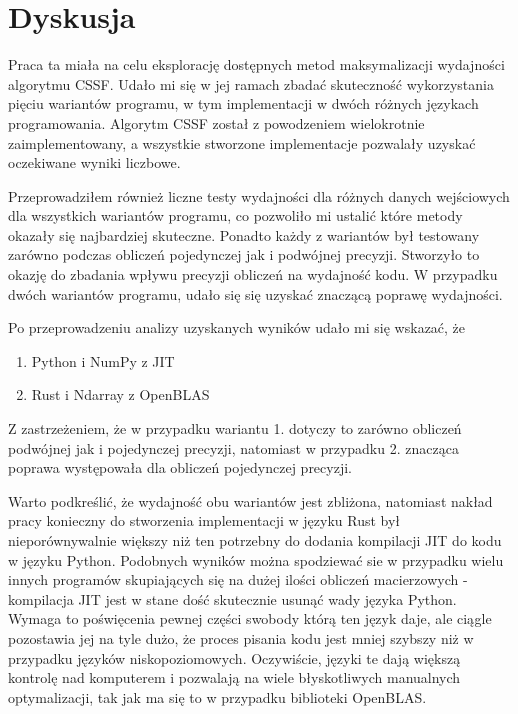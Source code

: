 \documentclass[11pt, a4paper]{article}
\begin{document}
\begin{sloppypar}
    \section{Dyskusja}


    Praca ta miała na celu eksplorację dostępnych metod maksymalizacji wydajności algorytmu
    CSSF. Udało mi się w jej ramach zbadać skuteczność wykorzystania pięciu wariantów
    programu, w tym implementacji w dwóch różnych językach programowania. Algorytm CSSF
    został z powodzeniem wielokrotnie zaimplementowany, a wszystkie stworzone implementacje
    pozwalały uzyskać oczekiwane wyniki liczbowe.

    Przeprowadziłem również liczne testy wydajności dla różnych danych wejściowych dla wszystkich
    wariantów programu, co pozwoliło mi ustalić które metody okazały się najbardziej
    skuteczne. Ponadto każdy z wariantów był testowany zarówno podczas obliczeń pojedynczej
    jak i podwójnej precyzji. Stworzyło to okazję do zbadania wpływu precyzji obliczeń
    na wydajność kodu. W przypadku dwóch wariantów programu, udało się się uzyskać
    znaczącą poprawę wydajności.

    Po przeprowadzeniu analizy uzyskanych wyników udało mi się wskazać, że
    \begin{enumerate}
      \item Python i NumPy z JIT

      \item Rust i Ndarray z OpenBLAS
    \end{enumerate}
    Z zastrzeżeniem, że w przypadku wariantu 1. dotyczy to zarówno obliczeń podwójnej
    jak i pojedynczej precyzji, natomiast w przypadku 2. znacząca poprawa występowała dla
    obliczeń pojedynczej precyzji.

    Warto podkreślić, że wydajność obu wariantów jest zbliżona, natomiast nakład pracy konieczny
    do stworzenia implementacji w języku Rust był nieporównywalnie większy niż ten potrzebny
    do dodania kompilacji JIT do kodu w języku Python. Podobnych wyników można
    spodziewać sie w przypadku wielu innych programów skupiających się na dużej ilości
    obliczeń macierzowych - kompilacja JIT jest w stane dość skutecznie usunąć wady
    języka Python. Wymaga to poświęcenia pewnej części swobody którą ten język daje, ale
    ciągle pozostawia jej na tyle dużo, że proces pisania kodu jest mniej szybszy niż w przypadku
    języków niskopoziomowych. Oczywiście, języki te dają większą kontrolę nad komputerem
    i pozwalają na wiele błyskotliwych manualnych optymalizacji, tak jak ma się to w
    przypadku biblioteki OpenBLAS.


\end{sloppypar}
\end{document}
